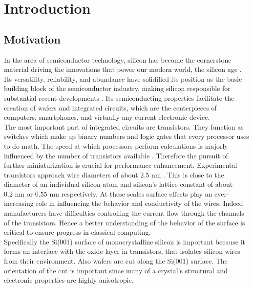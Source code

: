 	
	
	\tableofcontents
	
	
	
	\mainmatter
	\renewcommand{\chapterautorefname}{Chapter}
	\renewcommand{\sectionautorefname}{Section}
	\chapter{Introduction}
	\section{Motivation}
	In the area of semiconductor technology, silicon has become the cornerstone material driving the innovations that power our modern world, the silicon age \cite{dabrowski2000silicon}. Its versatility, reliability, and abundance have solidified its position as the basic building block of the semiconductor industry, making silicon responsible for substantial recent developments \cite{siffert2013silicon}. Its semiconducting properties facilitate the creation of wafers and integrated circuits, which are the centerpieces of computers, smartphones, and virtually any current electronic device. \\
	
	The most important part of integrated circuits are transistors. They function as switches which make up binary numbers and logic gates that every processor uses to do math. The speed at which processors perform calculations is majorly influenced by the number of transistors available \cite{el2015increasing}. Therefore the pursuit of further miniaturization is crucial for performance enhancement. Experimental transistors approach wire diameters of about $2.5\text{ nm}$ \cite{kim2016valley}. This is close to the diameter of an individual silicon atom and silicon's lattice constant of about $0.2\text{ nm}$ \cite{barsanov1962systematic} or $0.55 \text{ nm}$\cite{tiesinga2021codata} respectively. At these scales surface effects play an ever-increasing role in influencing the behavior and conductivity of the wires. Indeed manufacturers have difficulties controlling the current flow through the channels of the transistors. Hence a better understanding of the behavior of the surface is critical to ensure progress in classical computing. \\
	
	Specifically the Si(001) surface of monocrystalline silicon is important because it forms an interface with the oxide layer in transistors, that isolates silicon wires from their environment. Also wafers are cut along the Si(001) surface. The orientation of the cut is important since many of a crystal's structural and electronic properties are highly anisotropic. \\
	
